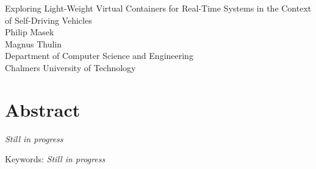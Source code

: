 Exploring Light-Weight Virtual Containers for Real-Time Systems in the Context of Self-Driving Vehicles\\
Philip Masek\\
Magnus Thulin\\
Department of Computer Science and Engineering\\
Chalmers University of Technology \setlength{\parskip}{0.5cm}

\thispagestyle{plain}			%
\setlength{\parskip}{0pt plus 1.0pt}
\section*{Abstract}
\textit{Still in progress}

\vfill
Keywords: \textit{Still in progress}


\newpage				%
\thispagestyle{empty}
\mbox{}